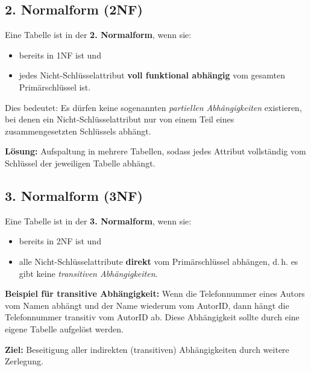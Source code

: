 \documentclass{article}
\begin{document}
\subsection*{2. Normalform (2NF)}
Eine Tabelle ist in der \textbf{2. Normalform}, wenn sie:
\begin{itemize}
	\item bereits in 1NF ist und
	\item jedes Nicht-Schlüsselattribut \textbf{voll funktional abhängig} vom gesamten Primärschlüssel ist.
\end{itemize}
Dies bedeutet: Es dürfen keine sogenannten \emph{partiellen Abhängigkeiten} existieren, bei denen ein Nicht-Schlüsselattribut nur von einem Teil eines zusammengesetzten Schlüssels abhängt.

\textbf{Lösung:} Aufspaltung in mehrere Tabellen, sodass jedes Attribut vollständig vom Schlüssel der jeweiligen Tabelle abhängt.

\subsection*{3. Normalform (3NF)}
Eine Tabelle ist in der \textbf{3. Normalform}, wenn sie:
\begin{itemize}
	\item bereits in 2NF ist und
	\item alle Nicht-Schlüsselattribute \textbf{direkt} vom Primärschlüssel abhängen, d.\,h. es gibt keine \emph{transitiven Abhängigkeiten}.
\end{itemize}

\textbf{Beispiel für transitive Abhängigkeit:} Wenn die Telefonnummer eines Autors vom Namen abhängt und der Name wiederum vom AutorID, dann hängt die Telefonnummer transitiv vom AutorID ab. Diese Abhängigkeit sollte durch eine eigene Tabelle aufgelöst werden.

\textbf{Ziel:} Beseitigung aller indirekten (transitiven) Abhängigkeiten durch weitere Zerlegung.

	
	
	
	
\end{document}
